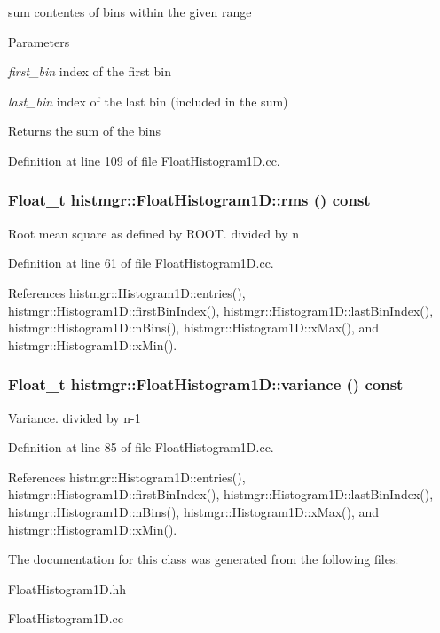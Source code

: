 sum contentes of bins within the given range 
\begin{DoxyParams}{Parameters}
\item[{\em first\_\-bin}]index of the first bin \item[{\em last\_\-bin}]index of the last bin (included in the sum) \end{DoxyParams}
\begin{DoxyReturn}{Returns}
the sum of the bins 
\end{DoxyReturn}


Definition at line 109 of file FloatHistogram1D.cc.
\subsubsection[{rms}]{\setlength{\rightskip}{0pt plus 5cm}Float\_\-t histmgr::FloatHistogram1D::rms () const}\label{classhistmgr_1_1FloatHistogram1D_a62605cd667af31082c3db712bc6ee337}


Root mean square as defined by ROOT. divided by n 

Definition at line 61 of file FloatHistogram1D.cc.

References histmgr::Histogram1D::entries(), histmgr::Histogram1D::firstBinIndex(), histmgr::Histogram1D::lastBinIndex(), histmgr::Histogram1D::nBins(), histmgr::Histogram1D::xMax(), and histmgr::Histogram1D::xMin().
\subsubsection[{variance}]{\setlength{\rightskip}{0pt plus 5cm}Float\_\-t histmgr::FloatHistogram1D::variance () const}\label{classhistmgr_1_1FloatHistogram1D_acb30c407ee9ad3bbdb85c208d6c8aee6}


Variance. divided by n-\/1 

Definition at line 85 of file FloatHistogram1D.cc.

References histmgr::Histogram1D::entries(), histmgr::Histogram1D::firstBinIndex(), histmgr::Histogram1D::lastBinIndex(), histmgr::Histogram1D::nBins(), histmgr::Histogram1D::xMax(), and histmgr::Histogram1D::xMin().

The documentation for this class was generated from the following files:\begin{DoxyCompactItemize}
\item 
FloatHistogram1D.hh\item 
FloatHistogram1D.cc\end{DoxyCompactItemize}
